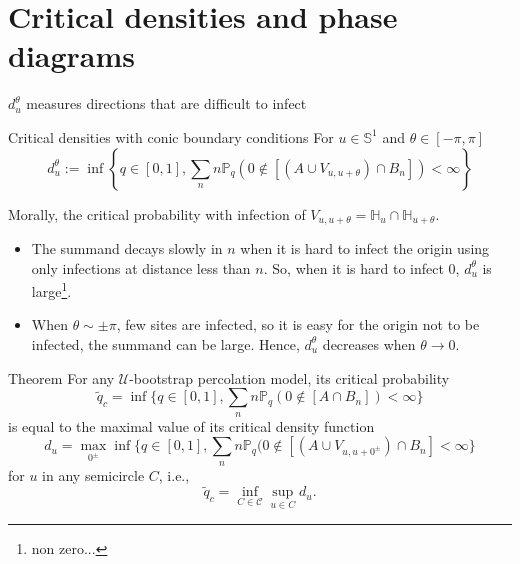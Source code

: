 
\section{Critical densities and phase diagrams}
\begin{frame}{$d_u^\theta$ measures directions that are difficult to infect}
	\begin{block}{Critical densities with conic boundary conditions}
		For $u\in \mathbb{S}^1$ and $\theta\in[-\pi, \pi]$
		$$d_u^\theta := \inf\left\{q\in[0,1], \sum_n n\mathbb{P}_q(0\not\in [(A\cup V_{u,u+\theta})\cap B_n]) < \infty\right\}$$
	\end{block}
	Morally, the critical probability with infection of $V_{u,u+\theta} = \mathbb{H}_u \cap \mathbb{H}_{u+\theta}$. 
	\begin{itemize}
		\item The summand decays slowly in $n$ when it is hard to infect the origin using only infections at distance less than $n$. So, when it is hard to infect 0,  $d_u^\theta$ is large\footnote{non zero...}.
		\item When $\theta \sim \pm \pi$, few sites are infected, so it is easy for the origin not to be infected, the summand can be large. Hence, $d_u^\theta$ decreases when $\theta\to 0$.
	\end{itemize}
\end{frame}




\begin{frame}

	\begin{block}{Theorem}
		For any $\mathcal{U}$-bootstrap percolation model, its critical probability
		\begin{equation*}
			\tilde q_c = \inf\{q\in[0,1], \sum_n n\mathbb{P}_q(0\not\in [A\cap B_n]) < \infty\}
		\end{equation*}
		is equal to the maximal value of its critical density function
		\begin{equation*}
			d_u = \max_{0^\pm} \inf\{q\in[0,1], \sum_n n\mathbb{P}_q(0\not\in[(A\cup V_{u, u + 0^\pm})\cap B_n] < \infty\}
		\end{equation*}
		for $u$ in any semicircle $C$, i.e.,
		\begin{equation*}
			\tilde q_c = \inf_{C\in \mathcal{C}} \sup_{u\in C} d_u.
		\end{equation*}

	\end{block}

\end{frame}


